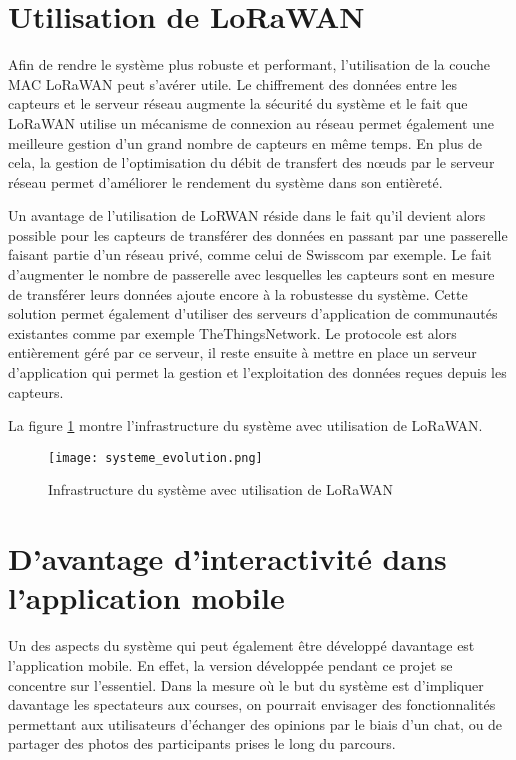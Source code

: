 \section{Utilisation de LoRaWAN}

Afin de rendre le système plus robuste et performant, l'utilisation de la couche MAC LoRaWAN peut s’avérer utile. Le chiffrement des données entre les capteurs et le serveur réseau augmente la sécurité du système et le fait que LoRaWAN utilise un mécanisme de connexion au réseau permet également une meilleure gestion d'un grand nombre de capteurs en même temps. En plus de cela, la gestion de l'optimisation du débit de transfert des nœuds par le serveur réseau permet d'améliorer le rendement du système dans son entièreté.

Un avantage de l'utilisation de LoRWAN réside dans le fait qu'il devient alors possible pour les capteurs de transférer des données en passant par une passerelle faisant partie d'un réseau privé, comme celui de Swisscom par exemple. Le fait d'augmenter le nombre de passerelle avec lesquelles les capteurs sont en mesure de transférer leurs données ajoute encore à la robustesse du système. Cette solution permet également d'utiliser des serveurs d'application de communautés existantes comme par exemple TheThingsNetwork. Le protocole est alors entièrement géré par ce serveur, il reste ensuite à mettre en place un serveur d'application qui permet la gestion et l'exploitation des données reçues depuis les capteurs.

La figure \ref{fig:sys_infra_evol} montre l'infrastructure du système avec utilisation de LoRaWAN.

\begin{figure}[tb]
\centering 
\texttt{[image: systeme\_evolution.png]} 
\caption{Infrastructure du système avec utilisation de LoRaWAN}
\label{fig:sys_infra_evol}
\end{figure}

\section{D'avantage d'interactivité dans l'application mobile}

Un des aspects du système qui peut également être développé davantage est l'application mobile. En effet, la version développée pendant ce projet se concentre sur l’essentiel. Dans la mesure où le but du système est d'impliquer davantage les spectateurs aux courses, on pourrait envisager des fonctionnalités permettant aux utilisateurs d'échanger des opinions par le biais d'un chat, ou de partager des photos des participants prises le long du parcours. 

